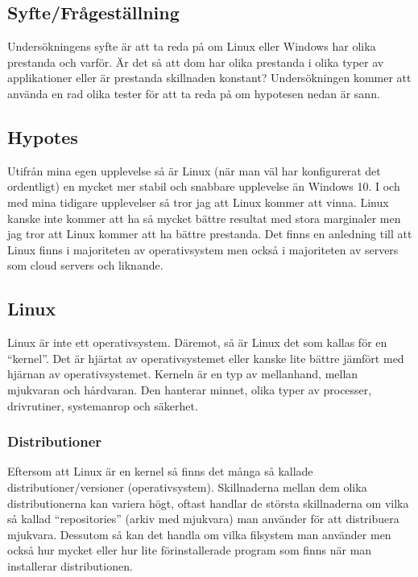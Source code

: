 \documentclass[12pt, a4paper]{report}
\begin{document}
    \subsection{Syfte/Frågeställning}
    Undersökningens syfte är att ta reda på om Linux eller Windows har olika prestanda och varför. Är det så att dom har olika prestanda i olika typer av applikationer eller är prestanda skillnaden konstant? Undersökningen kommer att använda en rad olika tester för att ta reda på om hypotesen nedan är sann.
 

    \subsection{Hypotes}

    Utifrån mina egen upplevelse så är Linux (när man väl har konfigurerat det ordentligt) en mycket mer stabil och snabbare upplevelse än Windows 10. I och med mina tidigare upplevelser så tror jag att Linux kommer att vinna. Linux kanske inte kommer att ha så mycket bättre resultat med stora marginaler men jag tror att Linux kommer att ha bättre prestanda.
    Det finns en anledning till att Linux finns i majoriteten av operativsystem men också i majoriteten av servers som cloud servers och liknande.
 

    \subsection{Linux}
 
   Linux är inte ett operativsystem. Däremot, så är Linux det som kallas för en ``kernel''\cite{redhat}. Det är hjärtat av operativsystemet eller kanske lite bättre jämfört med hjärnan av operativsystemet. Kerneln är en typ av mellanhand, mellan mjukvaran och hårdvaran. Den hanterar minnet, olika typer av processer, drivrutiner, systemanrop och säkerhet\cite{redhat}.
 

    \subsubsection{Distributioner}

   Eftersom att Linux är en kernel så finns det många så kallade distributioner/versioner (operativsystem). Skillnaderna mellan dem olika distributionerna kan variera högt, oftast handlar de största skillnaderna om vilka så kallad ``repositories'' (arkiv med mjukvara) man använder för att distribuera mjukvara. Dessutom så kan det handla om vilka filsystem man använder men också hur mycket eller hur lite förinstallerade program som finns när man installerar distributionen.
\end{document}
